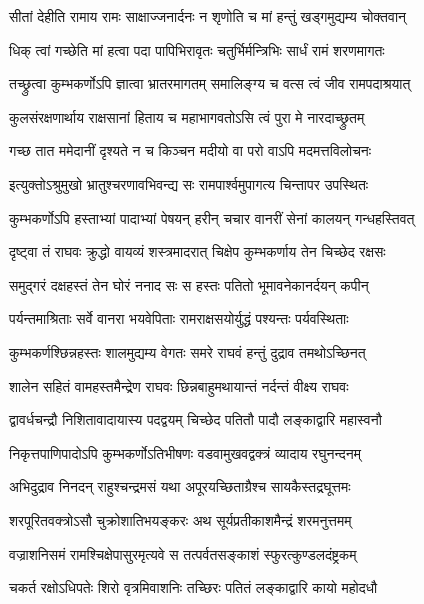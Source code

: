 \twolineshloka
{सीतां देहीति रामाय रामः साक्षाज्जनार्दनः}
{न शृणोति च मां हन्तुं खड्गमुद्यम्य चोक्तवान्} %

\twolineshloka
{धिक् त्वां गच्छेति मां हत्वा पदा पापिभिरावृतः}
{चतुर्भिर्मन्त्रिभिः सार्धं रामं शरणमागतः} %

\twolineshloka
{तच्छ्रुत्वा कुम्भकर्णोऽपि ज्ञात्वा भ्रातरमागतम्}
{समालिङ्ग्य च वत्स त्वं जीव रामपदाश्रयात्} %

\twolineshloka
{कुलसंरक्षणार्थाय राक्षसानां हिताय च}
{महाभागवतोऽसि त्वं पुरा मे नारदाच्छ्रुतम्} %

\twolineshloka
{गच्छ तात ममेदानीं दृश्यते न च किञ्चन}
{मदीयो वा परो वाऽपि मदमत्तविलोचनः} %

\twolineshloka
{इत्युक्तोऽश्रुमुखो भ्रातुश्चरणावभिवन्द्य सः}
{रामपार्श्वमुपागत्य चिन्तापर उपस्थितः} %

\twolineshloka
{कुम्भकर्णोऽपि हस्ताभ्यां पादाभ्यां पेषयन् हरीन्}
{चचार वानरीं सेनां कालयन् गन्धहस्तिवत्} %

\twolineshloka
{दृष्ट्वा तं राघवः क्रुद्धो वायव्यं शस्त्रमादरात्}
{चिक्षेप कुम्भकर्णाय तेन चिच्छेद रक्षसः} %

\twolineshloka
{समुद्गरं दक्षहस्तं तेन घोरं ननाद सः}
{स हस्तः पतितो भूमावनेकानर्दयन् कपीन्} %

\twolineshloka
{पर्यन्तमाश्रिताः सर्वे वानरा भयवेपिताः}
{रामराक्षसयोर्युद्धं पश्यन्तः पर्यवस्थिताः} %

\twolineshloka
{कुम्भकर्णश्छिन्नहस्तः शालमुद्यम्य वेगतः}
{समरे राघवं हन्तुं दुद्राव तमथोऽच्छिनत्} %

\twolineshloka
{शालेन सहितं वामहस्तमैन्द्रेण राघवः}
{छिन्नबाहुमथायान्तं नर्दन्तं वीक्ष्य राघवः} %

\twolineshloka
{द्वावर्धचन्द्रौ निशितावादायास्य पदद्वयम्}
{चिच्छेद पतितौ पादौ लङ्काद्वारि महास्वनौ} %

\twolineshloka
{निकृत्तपाणिपादोऽपि कुम्भकर्णोऽतिभीषणः}
{वडवामुखवद्वक्त्रं व्यादाय रघुनन्दनम्} %

\twolineshloka
{अभिदुद्राव निनदन् राहुश्चन्द्रमसं यथा}
{अपूरयच्छिताग्रैश्च सायकैस्तद्रघूत्तमः} %

\twolineshloka
{शरपूरितवक्त्रोऽसौ चुक्रोशातिभयङ्करः}
{अथ सूर्यप्रतीकाशमैन्द्रं शरमनुत्तमम्} %

\twolineshloka
{वज्राशनिसमं रामश्चिक्षेपासुरमृत्यवे}
{स तत्पर्वतसङ्काशं स्फुरत्कुण्डलदंष्ट्रकम्} %

\twolineshloka
{चकर्त रक्षोऽधिपतेः शिरो वृत्रमिवाशनिः}
{तच्छिरः पतितं लङ्काद्वारि कायो महोदधौ} %

